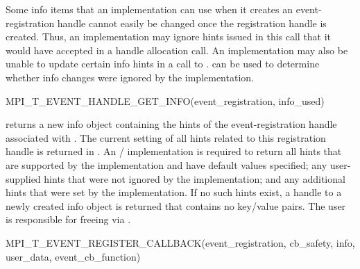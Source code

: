 \begin{users}
    Some info items that an implementation can use when it creates an
    event-registration handle cannot easily be changed once the
    registration handle is created. Thus, an implementation may ignore
    hints issued in this call that it would have accepted in a handle
    allocation call. An implementation may also be unable to update certain
    info hints in a call to .
     can be used to determine
    whether info changes were ignored by the implementation.
\end{users}


\begin{funcdef}{MPI\_T\_EVENT\_HANDLE\_GET\_INFO}{(\mbox{event\_registration}, \mbox{info\_used})}
\end{funcdef}

 returns a new info object
containing the hints of the event-registration handle associated with
.  The current setting of all hints related to
this registration handle is returned in .  An \MPI/
implementation is required to return all hints that are supported by the
implementation and have default values specified; any user-supplied hints
that were not ignored by the implementation; and any additional hints that
were set by the implementation.  If no such hints exist, a handle to a
newly created info object is returned that contains no key/value pairs.
The user is responsible for freeing  via
.


\begin{funcdef}{MPI\_T\_EVENT\_REGISTER\_CALLBACK}{(\mbox{event\_registration}, \mbox{cb\_safety}, \mbox{info}, \mbox{user\_data}, \mbox{event\_cb\_function})}
\end{funcdef}

